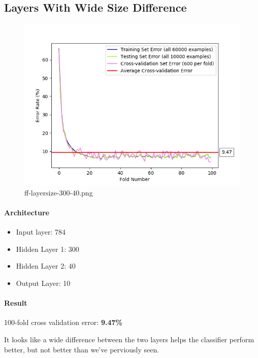 \documentclass[11pt]{article}
\makeatletter
\def\maxwidth{\ifdim\Gin@nat@width>\linewidth\linewidth
    \else\Gin@nat@width\fi}
\let\Oldincludegraphics\includegraphics
\renewcommand{\includegraphics}[1]{\Oldincludegraphics[width=.8\maxwidth]{#1}}
\providecommand{\tightlist}{%
      \setlength{\itemsep}{0pt}\setlength{\parskip}{0pt}}
\makeatother
\begin{document}
\pagebreak

\subsection{Layers With Wide Size
Difference}\label{layers-with-wide-size-difference}

\begin{figure}[htbp]
\centering
\includegraphics{plots/ff-layersize-300-40.png}
\caption{ff-layersize-300-40.png}
\end{figure}

\paragraph{Architecture}\label{architecture-6}

\begin{itemize}
\tightlist
\item
  Input layer: 784
\item
  Hidden Layer 1: 300
\item
  Hidden Layer 2: 40
\item
  Output Layer: 10
\end{itemize}

\paragraph{Result}\label{result-6}

100-fold cross validation error: \textbf{9.47\%}

It looks like a wide difference between the two layers helps the
classifier perform better, but not better than we've perviously seen.
\end{document}
